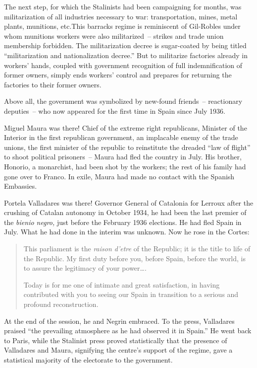 The next step, for which the Stalinists had been campaigning for months, was militarization of all industries necessary to war: transportation, mines, metal plants, munitions, etc.\@ This barracks regime is reminiscent of Gil-Robles under whom munitions workers were also militarized~-- strikes and trade union membership forbidden. The militarization decree is sugar-coated by being titled ``militarization and nationalization decree.'' But to militarize factories already in workers’ hands, coupled with government recognition of full indemnification of former owners, simply ends workers’ control and prepares for returning the factories to their former owners.

Above all, the government was symbolized by new-found friends~-- reactionary deputies~-- who now appeared for the first time in Spain since July 1936.

Miguel Maura was there! Chief of the extreme right republicans, Minister of the Interior in the first republican government, an implacable enemy of the trade unions, the first minister of the republic to reinstitute the dreaded ``law of flight'' to shoot political prisoners~-- Maura had fled the country in July. His brother, Honorio, a monarchist, had been shot by the workers; the rest of his family had gone over to Franco. In exile, Maura had made no contact with the Spanish Embassies.

Portela Valladares was there! Governor General of Catalonia for Lerroux after the crushing of Catalan autonomy in October 1934, he had been the last premier of the \emph{bienio negro,} just before the February 1936 elections. He had fled Spain in July. What he had done in the interim was unknown. Now he rose in the Cortes:

\begin{quotation}
  This parliament is the \emph{raison d’etre} of the Republic; it is the title to life of the Republic. My first duty before you, before Spain, before the world, is to assure the legitimacy of your power\dots.
  
  Today is for me one of intimate and great satisfaction, in having contributed with you to seeing our Spain in transition to a serious and profound reconstruction.
\end{quotation}

At the end of the session, he and Negrin embraced. To the press, Valladares praised ``the prevailing atmosphere as he had observed it in Spain.\kn\kn'' He went back to Paris, while the Stalinist press proved statistically that the presence of Valladares and Maura, signifying the centre’s support of the regime, gave a statistical majority of the electorate to the government.

